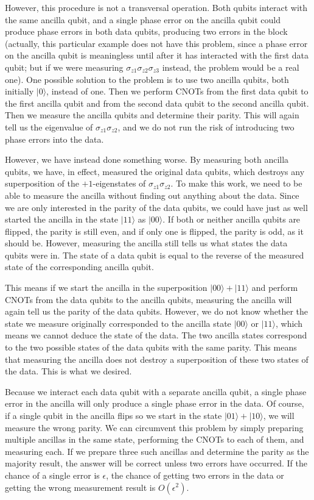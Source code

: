\documentclass{report}
\newcommand{\ket}[1]{|{#1}\rangle}
\newcommand{\Zs}[1]{\sigma_{z{#1}}}
\begin{document}
However, this procedure is not a transversal operation.  Both qubits 
interact with the same ancilla qubit, and a single phase error on the ancilla 
qubit could produce phase errors in both data qubits, producing two errors 
in the block (actually, this particular example does not have this problem, 
since a phase error on the ancilla qubit is meaningless until after it has 
interacted with the first data qubit; but if we were measuring $\Zs{1} \Zs{2} 
\Zs{3}$ instead, the problem would be a real one).  One possible solution to 
the problem is to use two ancilla qubits, both initially $\ket{0}$, instead of 
one.  Then we perform CNOTs from the first data qubit to the first ancilla 
qubit and from the second data qubit to the second ancilla qubit.  Then we 
measure the ancilla qubits and determine their parity.  This will again tell 
us the eigenvalue of $\Zs{1} \Zs{2}$, and we do not run the risk of introducing 
two phase errors into the data.

However, we have instead done something worse.  By measuring both 
ancilla qubits, we have, in effect, measured the original data qubits, which 
destroys any superposition of the $+1$-eigenstates of $\Zs{1} \Zs{2}$.  To make 
this work, we need to be able to measure the ancilla without finding out 
anything about the data.  Since we are only interested in the parity of the 
data qubits, we could have just as well started the ancilla in the state 
$\ket{11}$ as $\ket{00}$.  If both or neither ancilla qubits are flipped, the 
parity is still even, and if only one is flipped, the parity is odd, as it 
should be.  However, measuring the ancilla still tells us what states the data 
qubits were in.  The state of a data qubit is equal to the reverse of the 
measured state of the corresponding ancilla qubit.

This means if we start the ancilla in the superposition $\ket{00} + 
\ket{11}$ and perform CNOTs from the data qubits to the ancilla qubits, 
measuring the ancilla will again tell us the parity of the data qubits.  
However, we do not know whether the state we measure originally 
corresponded to the ancilla state $\ket{00}$ or $\ket{11}$, which means 
we cannot deduce the state of the data.  The two ancilla states correspond 
to the two possible states of the data qubits with the same parity.  This 
means that measuring the ancilla does not destroy a superposition of these 
two states of the data.  This is what we desired.

Because we interact each data qubit with a separate ancilla qubit, a single 
phase error in the ancilla will only produce a single phase error in the 
data.  Of course, if a single qubit in the ancilla flips so we start in the 
state $\ket{01} + \ket{10}$, we will measure the wrong parity.  We can 
circumvent this problem by simply preparing multiple ancillas in the same 
state, performing the CNOTs to each of them, and measuring each.  If we 
prepare three such ancillas and determine the parity as the majority 
result, the answer will be correct unless two errors have occurred.  If the 
chance of a single error is $\epsilon$, the chance of getting two errors in 
the data or getting the wrong measurement result is $O(\epsilon^2)$.
\end{document}
